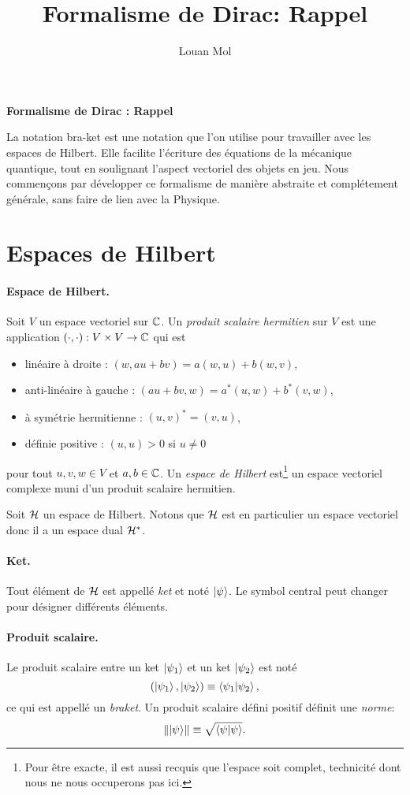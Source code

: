 \documentclass[11pt,a4paper,oneside]{article}
\title{Formalisme de Dirac: Rappel}
\author{Louan Mol}
\begin{document}
\begin{center}
    {\huge \textbf{Formalisme de Dirac : Rappel}}
\end{center}

\vspace{1cm}

\qquad La notation bra-ket est une notation que l'on utilise pour travailler avec les espaces de Hilbert. Elle facilite l'écriture des équations de la mécanique quantique, tout en soulignant l'aspect vectoriel des objets en jeu. Nous commençons par développer ce formalisme de manière abstraite et complétement générale, sans faire de lien avec la Physique.

\section{Espaces de Hilbert}

\paragraph{Espace de Hilbert.} Soit $V$ un espace vectoriel sur $\mathbb{C}$. Un \emph{produit scalaire hermitien} sur $V$ est une application $(\cdot,\cdot):V\times V\to\mathbb{C}$ qui est
\begin{itemize}[label=\tb]
    \item linéaire à droite : $(w,au+bv) = a(w,u)+b(w,v)$,
    \item anti-linéaire à gauche : $(au+bv,w) = a^*(u,w)+b^*(v,w)$,
    \item à symétrie hermitienne : $(u,v)^*=(v,u)$,
    \item définie positive : $(u,u)>0$ si $u\neq0$
\end{itemize}
pour tout $u,v,w\in V$ et $a,b\in\mathbb{C}$. Un \emph{espace de Hilbert} est\footnote{Pour être exacte, il est aussi recquis que l'espace soit complet, technicité dont nous ne nous occuperons pas ici.} un espace vectoriel complexe muni d'un produit scalaire hermitien. 

Soit $\mathcal{H}$ un espace de Hilbert. Notons que $\mathcal{H}$ est en particulier un espace vectoriel donc il a un espace dual $\mathcal{H}^*$.

\paragraph{Ket.} Tout élément de $\mathcal{H}$ est appellé \emph{ket} et noté $\ket{\psi_{}}$. Le symbol central peut changer pour désigner différents éléments.

\paragraph{Produit scalaire.} Le produit scalaire entre un ket $\ket{\psi_{1}}$ et un ket $\ket{\psi_{2}}$ est noté
\begin{equation}
    (\ket{\psi_{1}},\ket{\psi_{2}}) \equiv \braket{\psi_1}{\psi_2},
\end{equation}
ce qui est appellé un \emph{braket}. Un produit scalaire défini positif définit une \emph{norme}:
\begin{equation}
    \norm{\ket{\psi_{}}} \equiv \sqrt{\braket{\psi}}.
\end{equation}
\end{document}
